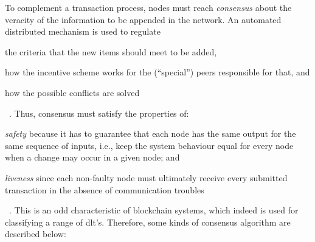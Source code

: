 To complement a transaction process, nodes must reach \emph{consensus} about the veracity of the information to be appended in the network.
An automated distributed mechanism is used to regulate
\begin{enumerate*}[label={(\roman*)}]
    \item the criteria that the new items should meet to be added,
    \item how the incentive scheme works for the (``special'') peers responsible for that, and
    \item how the possible conflicts are solved
\end{enumerate*}~\cite{xu2017}.
Thus, consensus must satisfy the properties of:
\begin{enumerate*}[label={(\roman*)}]
    \item \textit{safety} because it has to guarantee that each node has the same output for the same sequence of inputs, i.e., keep the system behaviour equal for every node when a change may occur in a given node; and
    \item \textit{liveness} since each non-faulty node must ultimately receive every submitted transaction in the absence of communication troubles
\end{enumerate*}
~\cite{hyper1}.
This is an odd characteristic of blockchain systems, which indeed is used for classifying a range of \gls{dlt}'s.
Therefore, some kinds of consensus algorithm are described below:
